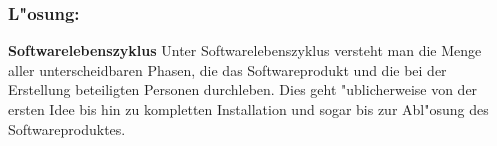 \subsubsection*{L"osung:}

\begin{defi}
  \textbf{Softwarelebenszyklus}
  \smallbreak
  Unter Softwarelebenszyklus versteht man die Menge aller unterscheidbaren Phasen, die das Softwareprodukt und die bei der Erstellung beteiligten Personen durchleben. Dies geht "ublicherweise von der ersten Idee bis hin zu kompletten Installation und sogar bis zur Abl"osung des Softwareproduktes.
\end{defi}
\smallbreak

%

